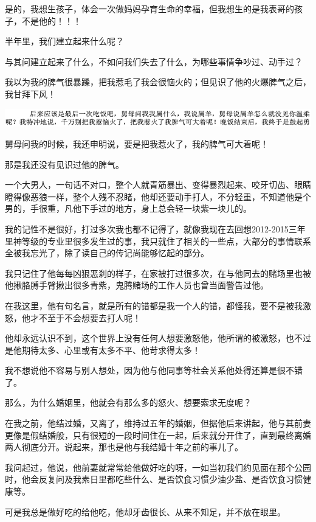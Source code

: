 \documentclass[9pt, b5paper]{article}
\begin{document}
是的，我想生孩子，体会一次做妈妈孕育生命的幸福，但我想生的是我表哥的孩子，不是他的！！！

半年里，我们建立起来什么呢？

与其问建立起来了什么，不如问我们失去了什么，为哪些事情争吵过、动手过？

我以为我的脾气很暴躁，把我惹毛了我会很恼火的；但见识了他的火爆脾气之后，我甘拜下风！

\begin{center}
\includegraphics[width=.9\linewidth]{./pic/backups_plans_20210427_195919.png}
\end{center}

舅母问我的时候，我还申明说，要是把我惹火了，我的脾气可大着呢！

那是我还没有见识过他的脾气。

一个大男人，一句话不对口，整个人就青筋暴出、变得暴烈起来、咬牙切齿、眼睛瞪得像恶狼一样，整个人残不忍睹，他却还要动手打人，不分轻重，不知道他是个男的，手很重，凡他下手过的地方，身上总会轻一块紫一块儿的。

我的记性不是很好，打过多次我也都不记得了，就像我现在去回想2012-2015三年里神等级的专业里很多发生过的事，我只就住了相关的一些点，大部分的事情联系全被我忘光了，除了读自己的传记尚能够忆起的部分。

我只记住了他每每凶狠恶刹的样子，在家被打过很多次，在与他同去的赌场里也被他揪胳膊手臂揪出很多青紫，鬼腾赌场的工作人员也曾当面警告过他。

在我这里，他有句名言，就是所有的错都是我一个人的错，都怪我，要不是被我激怒，他才不至于不会想要去打人呢！

他却永远认识不到，这个世界上没有任何人想要激怒他，他所谓的被激怒，也不过是他期待太多、心里或有太多不平、他苛求得太多！

我不想说他不容易与别人想处，因为他与他同事等社会关系他处得还算是很不错了。

那么，为什么婚姻里，他就会有那么多的怒火、想要索求无度呢？

在我之前，他结过婚，又离了，维持过五年的婚姻，但据他后来讲起，他与其前妻更像是假结婚般，只有很短的一段时间住在一起，后来就分开住了，直到最终离婚两人彻底分开。说起来，那也是他与我结婚十年之前的事儿了。

我问起过，他说，他前妻就常常给他做好吃的呀，一如当初我们约见面在那个公园时，他会反复问及我素日里都吃些什么、是否饮食习惯少油少盐、是否饮食习惯健康等。

可是我总是做好吃的给他吃，他却牙齿很长、从来不知足，并不放在眼里。
\end{document}
